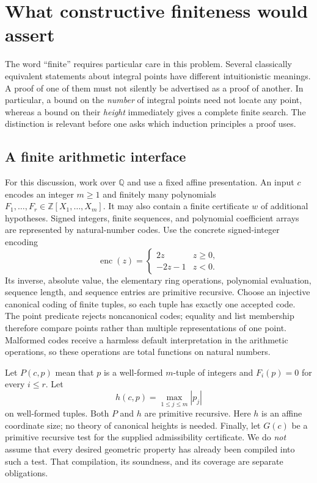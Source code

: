 \section{What constructive finiteness would assert}
\label{sec:logical-audit}

The word ``finite'' requires particular care in this problem.  Several
classically equivalent statements about integral points have different
intuitionistic meanings.  A proof of one of them must not silently be advertised
as a proof of another.  In particular, a bound on the \emph{number} of integral
points need not locate any point, whereas a bound on their \emph{height}
immediately gives a complete finite search.  The distinction is relevant before
one asks which induction principles a proof uses.

\subsection{A finite arithmetic interface}

For this discussion, work over $\mathbb Q$ and use a fixed affine presentation.
An input $c$ encodes an integer $m\geq 1$ and finitely many polynomials
$F_1,\ldots,F_r\in\mathbb Z[X_1,\ldots,X_m]$.  It may also contain a finite
certificate $w$ of additional hypotheses.  Signed integers, finite sequences,
and polynomial coefficient arrays are represented by natural-number codes.
Use the concrete signed-integer encoding
\[
 \operatorname{enc}(z)=
 \begin{cases}2z&z\geq0,\\-2z-1&z<0.\end{cases}
\]
Its inverse, absolute value, the elementary ring operations, polynomial
evaluation, sequence length, and sequence entries are primitive recursive.
Choose an injective canonical coding of finite tuples, so each tuple has
exactly one accepted code.  The point predicate rejects noncanonical codes;
equality and list membership therefore compare points rather than multiple
representations of one point.  Malformed codes receive a harmless default
interpretation in the arithmetic operations, so these operations are total
functions on natural numbers.

Let $P(c,p)$ mean that $p$ is a well-formed $m$-tuple of integers and
$F_i(p)=0$ for every $i\leq r$.  Let
\[
 h(c,p)=\max_{1\leq j\leq m}|p_j|
\]
on well-formed tuples.  Both $P$ and $h$ are primitive recursive.  Here $h$ is
an affine coordinate size; no theory of canonical heights is needed.  Finally,
let $G(c)$ be a primitive recursive test for the supplied admissibility
certificate.  We do \emph{not} assume that every desired geometric property has
already been compiled into such a test.  That compilation, its soundness, and
its coverage are separate obligations.


